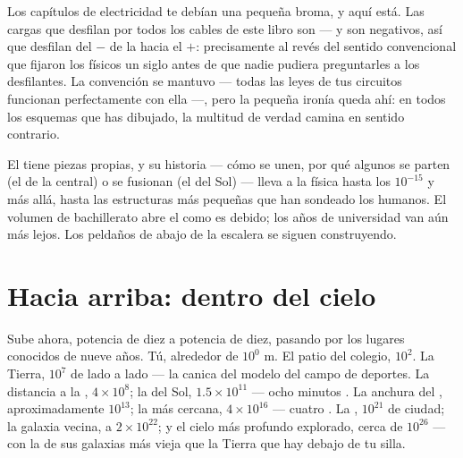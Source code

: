 \begin{example}\label{ex:g9:atoms-to-galaxies:electron}
Los capítulos de electricidad te debían una pequeña broma, y aquí está.
Las cargas que desfilan por todos los cables de este libro son
\emph{} --- y son negativos, así que desfilan del
 $-$ de la  hacia el $+$: precisamente al
revés del sentido convencional que fijaron los físicos un siglo antes
de que nadie pudiera preguntarles a los desfilantes. La convención se
mantuvo --- todas las leyes de tus circuitos funcionan perfectamente con
ella ---, pero la pequeña ironía queda ahí: en todos los esquemas que
has dibujado, la multitud de verdad camina en sentido contrario.
\end{example}

\begin{example}\label{ex:g9:atoms-to-galaxies:deeper}
El  tiene piezas propias, y su historia --- cómo se unen,
por qué algunos  se parten (el  de la central) o se
fusionan (el del Sol) --- lleva a la física hasta los $10^{-15}$
 y más allá, hasta las estructuras más pequeñas que han
sondeado los humanos. El volumen de bachillerato abre el
 como es debido; los años de universidad van aún más lejos.
Los peldaños de abajo de la escalera se siguen construyendo.
\end{example}

\section{Hacia arriba: dentro del cielo}

\begin{example}[El ascenso]\label{ex:g9:atoms-to-galaxies:ascent}
Sube ahora, potencia de diez a potencia de diez, pasando por los
lugares conocidos de nueve años. Tú, alrededor de $10^{0}$ \unit{m}. El
patio del colegio, $10^{2}$. La Tierra, $10^{7}$ de lado a lado --- la
canica del modelo del campo de deportes. La distancia a la
, $4 \times 10^{8}$; la del Sol, $1.5 \times 10^{11}$ --- ocho
minutos . La anchura del , aproximadamente
$10^{13}$; la  más cercana, $4 \times 10^{16}$ --- cuatro
. La , $10^{21}$  de
ciudad; la galaxia vecina, a $2 \times 10^{22}$; y el cielo más
profundo explorado, cerca de $10^{26}$  --- con la
 de sus galaxias más vieja que la Tierra que hay debajo de tu
silla.
\end{example}

